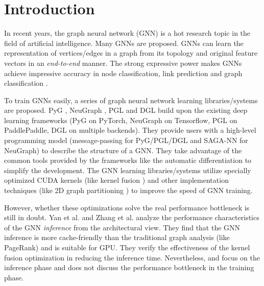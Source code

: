\section{Introduction}

In recent years, the graph neural network (GNN) is a hot research topic in the field of artificial intelligence.
Many GNNs \cite{kipf2017_gcn, defferrad2016_chebnet, li2018_agcn,li2015_ggnn, hamilton2017_graphsage, huang2018_gat, zhang2018_gaan} are proposed.
GNNs can learn the representation of vertices/edges in a graph from its topology and original feature vectors in an \emph{end-to-end} manner.
The strong expressive power makes GNNs achieve impressive accuracy in node classification, link prediction and graph classification \cite{zhou2018_gnn_review, zhang2018_gnn_survey, comprehensive-survey-wu-2020}.

To train GNNs easily, a series of graph neural network learning libraries/systems \cite{PyG, DGL, ma2019_neugraph, zhu2019_aligraph, PGL} are proposed.
PyG \cite{PyG}, NeuGraph \cite{ma2019_neugraph}, PGL \cite{PGL} and DGL \cite{DGL} build upon the existing deep learning frameworks (PyG on PyTorch, NeuGraph on Tensorflow, PGL on PaddlePaddle, DGL on multiple backends).
They provide users with a high-level programming model (message-passing for PyG/PGL/DGL and SAGA-NN for NeuGraph) to describe the structure of a GNN.
They take advantage of the common tools provided by the frameworks like the automatic differentiation to simplify the development.
The GNN learning libraries/systems utilize specially optimized CUDA kernels (like kernel fusion \cite{DGL} \cite{ma2019_neugraph}) and other implementation techniques (like 2D graph partitioning \cite{ma2019_neugraph}) to improve the speed of GNN training.

However, whether these optimizations solve the real performance bottleneck is still in doubt.
Yan et al. \cite{yan2020_characterizing_gcn} and Zhang et al. \cite{zhang2020_analysis_neugraph} analyze the performance characteristics of the GNN \emph{inference} from the architectural view.
They find that the GNN inference is more cache-friendly than the traditional graph analysis (like PageRank) and is suitable for GPU.
They verify the effectiveness of the kernel fusion optimization in reducing the inference time.
Nevertheless, \cite{yan2020_characterizing_gcn} and \cite{zhang2020_analysis_neugraph} focus on the inference phase and does not discuss the performance bottleneck in the training phase.

